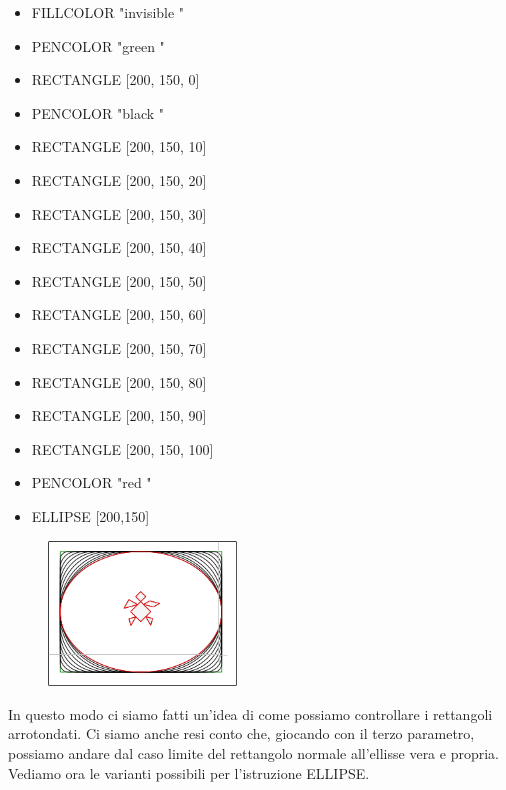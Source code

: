 \begin{scriptsize}
\begin{minipage}{0.40\textwidth}
\begin{itemize}[itemsep=-3pt,parsep=2pt]
\item[] FILLCOLOR  "invisible " 
\item[] PENCOLOR  "green " 
\item[] RECTANGLE [200, 150, 0] 
\item[] PENCOLOR  "black " 
\item[] RECTANGLE [200, 150, 10] 
\item[] RECTANGLE [200, 150, 20] 
\item[] RECTANGLE [200, 150, 30] 
\item[] RECTANGLE [200, 150, 40] 
\item[] RECTANGLE [200, 150, 50] 
\item[] RECTANGLE [200, 150, 60] 
\item[] RECTANGLE [200, 150, 70] 
\item[] RECTANGLE [200, 150, 80] 
\item[] RECTANGLE [200, 150, 90] 
\item[] RECTANGLE [200, 150, 100] 
\item[] PENCOLOR  "red " 
\item[] ELLIPSE [200,150]          
\end{itemize}
\end{minipage}
\end{scriptsize}
\begin{minipage}{0.4\textwidth}
\begin{figure}[H]
   \includegraphics[width=5.0cm,trim=4 4 8 4,clip]{./images/disegnare/disegnare-26.png}
   \label{dis-25}
\end{figure}
\end{minipage} \hfill

\vskip 1cm
 
In questo modo ci siamo fatti un'idea di come possiamo controllare i rettangoli arrotondati. Ci siamo anche resi conto che, giocando con il terzo parametro, possiamo andare dal caso limite del rettangolo normale all'ellisse vera e propria.
Vediamo ora le varianti possibili per l'istruzione ELLIPSE.


